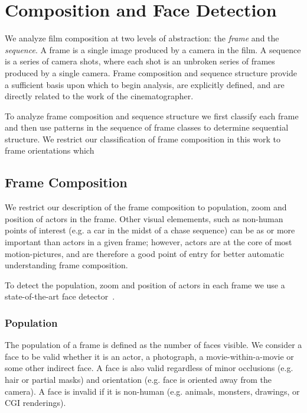 \section*{Composition and Face Detection}

We analyze film composition at two levels of abstraction: the \emph{frame} and the \emph{sequence}.  A frame is a single image produced by a camera in the film.  A sequence is a series of camera shots, where each shot is an unbroken series of frames produced by a single camera.  Frame composition and sequence structure provide a sufficient basis upon which to begin analysis, are explicitly defined, and are directly related to the work of the cinematographer.

To analyze frame composition and sequence structure we first classify each frame and then use patterns in the sequence of frame classes to determine sequential structure.  We restrict our classification of frame composition in this work to frame orientations which  

\subsection{Frame Composition}

We restrict our description of the frame composition to population, zoom
and position of actors in the frame. Other visual elemements, such as
non-human points of interest (e.g. a car in the midst of
a chase sequence) can be as or more important than actors in a given frame;
 however, actors are at the core of most motion-pictures, and are therefore a good point of
 entry for better automatic understanding frame composition.

To detect the population, zoom and position of actors in each frame we 
use a state-of-the-art face detector~\cite{mathias_face_2014}.  

\subsubsection{Population}
The population of a frame is defined as the number of faces visible. We consider a face to be valid whether it is an actor, a photograph, a movie-within-a-movie or some other indirect face. A face is also valid regardless of minor occlusions (e.g. hair or partial masks) and orientation (e.g. face is oriented away from the camera). A face is invalid if it is non-human (e.g. animals, monsters, drawings, or CGI renderings). 


